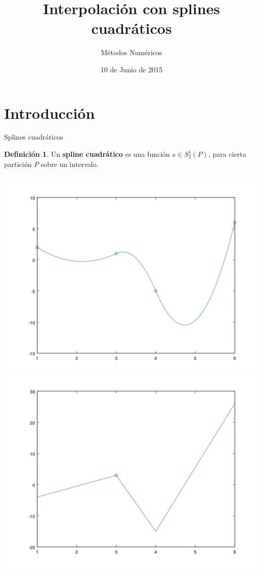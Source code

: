 \documentclass[compress]{beamer}
\title{Interpolación con splines cuadráticos} %
\subtitle{Métodos Numéricos}                  %
\author[Rubén M. \and Pablo B. \and Francisco M. \and Pablo M.\and Miguel A.]
{\texorpdfstring{
  \begin{columns}
    \column{.2\linewidth}
    \centering
    Rubén Morales \\
    \column{.2\linewidth}
    \centering
    Pablo Baeyens \\
    \column{.2\linewidth}
    \centering
    Francisco Morales \\
    \column{.2\linewidth}
    \centering
    Pablo Medina \\
    \column{.2\linewidth}
    \centering
    Miguel Anguita \\
  \end{columns}
}{
Rubén Morales \and Pablo Baeyens \and Francisco Morales
\and Pablo Medina \and Miguel Anguita
}}
\date{10 de Junio de 2015} %
\theoremstyle{definition}
\newtheorem*{definicion}{Definición}
\begin{document}
\begin{frame}
\titlepage
\end{frame}

\section{Introducción}

\begin{frame}{Splines cuadráticos}
\begin{definicion}
Un \textbf{spline cuadrático} es una función $s \in S_2^1(P)$, para
cierta partición $P$ sobre un intervalo.
\end{definicion}
\begin{columns}
\includegraphics[width=\textwidth]{EjemploDef.png}
\includegraphics[width=\textwidth]{EjemploDefDer.png}
\end{columns}
\end{frame}
\end{document}
